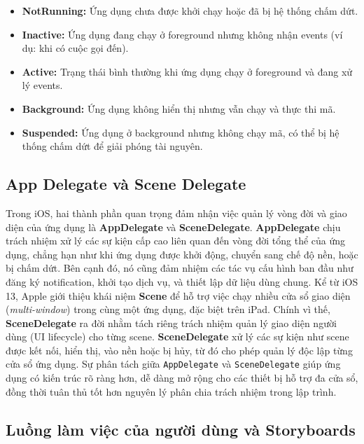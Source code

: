         \setlength{\leftmargini}{0.55cm}
        \begin{itemize}
            \item[]\textbf{NotRunning:} Ứng dụng chưa được khởi chạy hoặc đã bị hệ thống chấm dứt.
            \item[]\textbf{Inactive:} Ứng dụng đang chạy ở foreground nhưng không nhận events (ví dụ: khi có cuộc gọi đến).
            \item[]\textbf{Active:} Trạng thái bình thường khi ứng dụng chạy ở foreground và đang xử lý events.
            \item[]\textbf{Background:} Ứng dụng không hiển thị nhưng vẫn chạy và thực thi mã.
            \item[]\textbf{Suspended:} Ứng dụng ở background nhưng không chạy mã, có thể bị hệ thống chấm dứt để giải phóng tài nguyên.
        \end{itemize}

         \subsection{App Delegate và Scene Delegate}
         Trong iOS, hai thành phần quan trọng đảm nhận việc quản lý vòng đời và giao diện của ứng dụng là \textbf{AppDelegate} và \textbf{SceneDelegate}. \textbf{AppDelegate} \cite{ App-Scene Delegate} chịu trách nhiệm xử lý các sự kiện cấp cao liên quan đến vòng đời tổng thể của ứng dụng, chẳng hạn như khi ứng dụng được khởi động, chuyển sang chế độ nền, hoặc bị chấm dứt. Bên cạnh đó, nó cũng đảm nhiệm các tác vụ cấu hình ban đầu như đăng ký notification, khởi tạo dịch vụ, và thiết lập dữ liệu dùng chung.
         Kể từ iOS 13, Apple giới thiệu khái niệm \textbf{Scene} để hỗ trợ việc chạy nhiều cửa sổ giao diện (\textit{multi-window}) trong cùng một ứng dụng, đặc biệt trên iPad. Chính vì thế, \textbf{SceneDelegate} ra đời nhằm tách riêng trách nhiệm quản lý giao diện người dùng (UI lifecycle) cho từng scene. \textbf{SceneDelegate} xử lý các sự kiện như scene được kết nối, hiển thị, vào nền hoặc bị hủy, từ đó cho phép quản lý độc lập từng cửa sổ ứng dụng.
         Sự phân tách giữa \texttt{AppDelegate} và \texttt{SceneDelegate} giúp ứng dụng có kiến trúc rõ ràng hơn, dễ dàng mở rộng cho các thiết bị hỗ trợ đa cửa sổ, đồng thời tuân thủ tốt hơn nguyên lý phân chia trách nhiệm trong lập trình.

         \subsection{Luồng làm việc của người dùng và Storyboards}

